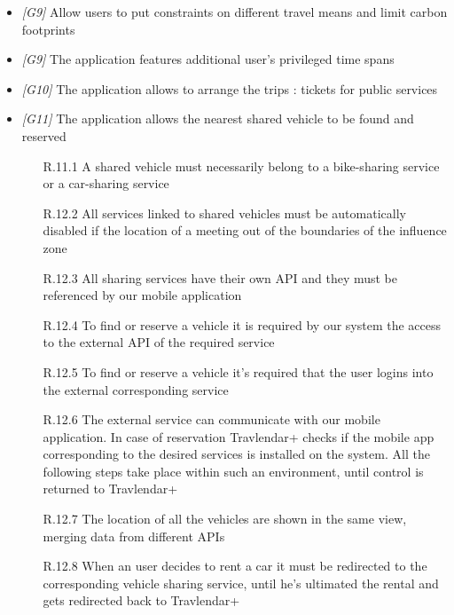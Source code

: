 \begin{itemize}
\item \textit{[G9]} Allow users to put constraints on different travel means and limit carbon footprints





\item \textit{[G9]} The application features additional user’s privileged time spans 

\item \textit{[G10]} The application allows to arrange the trips : tickets for public services

\item \textit{[G11]} The application allows the nearest shared vehicle to be found and reserved

                   \begin{itemize}
                        \item [R.11.1] A shared vehicle must necessarily belong to a bike-sharing service or a car-sharing service
                        \item [R.12.2] All services linked to shared vehicles must be automatically disabled if the location of a meeting out of the boundaries of the influence zone
                        \item [R.12.3] All sharing services have their own API and they must be referenced by our mobile application
                        \item [R.12.4] To find or reserve a vehicle it is required by our system the access to the external API of the required service
                        \item [R.12.5] To find or reserve a vehicle it's required that the user logins into the external corresponding service
                        \item [R.12.6] The external service can communicate with our mobile application. In case of reservation Travlendar+ checks if the mobile app corresponding to the desired services is installed on the system. All the following steps take place within such an environment, until control is returned to Travlendar+
                        \item [R.12.7] The location of all the vehicles are shown in the same view, merging data from different APIs
                        \item [R.12.8] When an user decides to rent a car it must be redirected to the corresponding vehicle sharing service, until he's ultimated the rental and gets redirected back to Travlendar+
                        \end{itemize}


\end{itemize}
